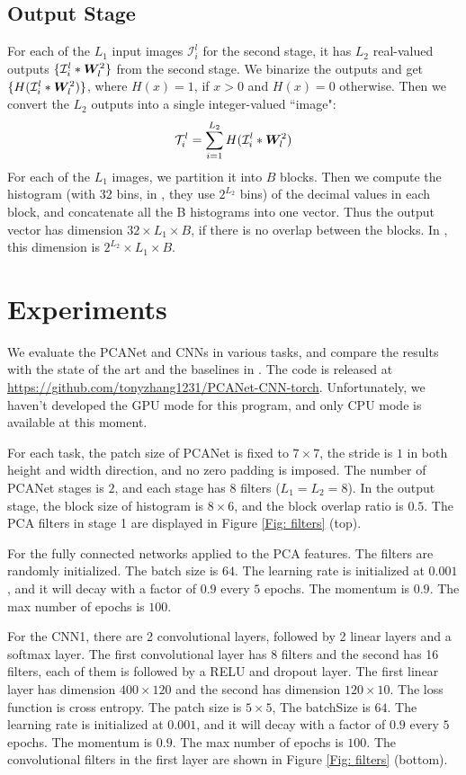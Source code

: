\documentclass{article} %
\begin{document}
\subsection{Output Stage} \label{subsection: Output Stage}
For each of the $L_1$ input images $\mathcal{I}_i^l$ for the second stage, it has $L_2$ real-valued outputs $ \{\mathcal{I}_i^l * \boldsymbol{W}_l^2 \}$ from the second stage. We binarize the outputs and get $\{H(\mathcal{I}_i^l * \boldsymbol{W}_l^2) \}$, where $H(x)=1$, if $x>0$ and $H(x)=0$ otherwise. Then we convert the $L_2$ outputs into a single integer-valued ``image":
\begin{eqnarray*}
	\mathcal{T}_i^l=\sum_{i=1}^{L_2} H(\mathcal{I}_i^l * \boldsymbol{W}_l^2)
\end{eqnarray*} 
For each of the $L_1$ images, we partition it into $B$ blocks. Then we compute the histogram (with 32 bins, in \cite{chan2015pcanet}, they use $2^{L_2}$ bins) of the decimal values in each block, and concatenate all the B histograms into one vector. Thus the output vector has dimension $32 \times L_1 \times B$, if there is no overlap between the blocks. In \cite{chan2015pcanet}, this dimension is $2^{L_2} \times L_1 \times B$.

\section{Experiments}
We evaluate the PCANet and CNNs in various tasks, and compare the results with the state of the art and the baselines in \cite{chan2015pcanet}. The code is released at \url{https://github.com/tonyzhang1231/PCANet-CNN-torch}. Unfortunately, we haven't developed the GPU mode for this program, and only CPU mode is available at this moment.

For each task, the patch size of PCANet is fixed to $7 \times 7$, the stride is $1$ in both height and width direction, and no zero padding is imposed. The number of PCANet stages is $2$, and each stage has $8$ filters ($L_1=L_2=8$). In the output stage, the block size of histogram is $8 \times 6$, and the block overlap ratio is $0.5$. The PCA filters in stage 1 are displayed in Figure \ref{Fig: filters} (top).

For the fully connected networks applied to the PCA features. The filters are randomly initialized. The batch size is $64$. The learning rate is initialized at $0.001$, and it will decay with a factor of $0.9$ every $5$ epochs. The momentum is $0.9$. The max number of epochs is $100$.

For the CNN1, there are 2 convolutional layers, followed by 2 linear layers and a softmax layer. The first convolutional layer has 8 filters and the second has 16 filters, each of them is followed by a RELU and dropout layer. The first linear layer has dimension $400 \times 120$ and the second has dimension $120 \times 10$. The loss function is cross entropy. The patch size is $5 \times 5$, The batchSize is $64$. The learning rate is initialized at $0.001$, and it will decay with a factor of $0.9$ every $5$ epochs. The momentum is $0.9$. The max number of epochs is $100$. The convolutional filters in the first layer are shown in Figure \ref{Fig: filters} (bottom).
\end{document}
